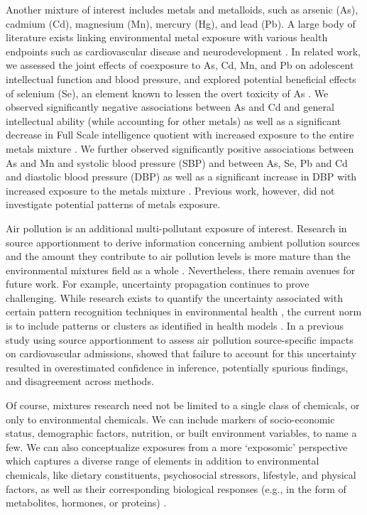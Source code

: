 Another mixture of interest includes metals and metalloids, such as arsenic (As), cadmium (Cd), magnesium (Mn), mercury (Hg), and lead (Pb). A large body of literature exists linking environmental metal exposure with various health endpoints such as cardiovascular disease \citep{nigra2016environmental} and neurodevelopment \citep{henn2012associations}. In related work, we assessed the joint effects of coexposure to As, Cd, Mn, and Pb on adolescent intellectual function and blood pressure, and explored potential beneficial effects of selenium (Se), an element known to lessen the overt toxicity of As \citep{levander1977metabolic}. We observed significantly negative associations between As and Cd and general intellectual ability (while accounting for other metals) as well as a significant decrease in Full Scale intelligence quotient with increased exposure to the entire metals mixture \citep{wasserman2018cross}. We further observed significantly positive associations between As and Mn and systolic blood pressure (SBP) and between As, Se, Pb and Cd and diastolic blood pressure (DBP) as well as a significant increase in DBP with increased exposure to the metals mixture \citep{chen2019early}. Previous work, however, did not investigate potential patterns of metals exposure.

Air pollution is an additional multi-pollutant exposure of interest. Research in source apportionment to derive information concerning ambient pollution sources and the amount they contribute to air pollution levels is more mature than the environmental mixtures field as a whole \citep{paatero94, sun2020positive, krall2017associations}. Nevertheless, there remain avenues for future work. For example, uncertainty propagation continues to prove challenging. While research exists to quantify the uncertainty associated with certain pattern recognition techniques in environmental health \citep{park2015part, gass2015ensemble}, the current norm is to include patterns or clusters as identified in health models \citep{austin2012framework, zanobetti2014health, sarnat2008fine, krall2017associations, basagana2016neurodevelopmental, siponen2015source, dai2016fine}. In a previous study using source apportionment to assess air pollution source-specific impacts on cardiovascular admissions, \citet{mak14_unc} showed that failure to account for this uncertainty resulted in overestimated confidence in inference, potentially spurious findings, and disagreement across methods.

Of course, mixtures research need not be limited to a single class of chemicals, or only to environmental chemicals. We can include markers of socio-economic status, demographic factors, nutrition, or built environment variables, to name a few. We can also conceptualize exposures from a more `exposomic' perspective which captures a diverse range of elements in addition to environmental chemicals, like dietary constituents, psychosocial stressors, lifestyle, and physical factors, as well as their corresponding biological responses (e.g., in the form of metabolites, hormones, or proteins) \citep{vermeulen2020exposome}.


